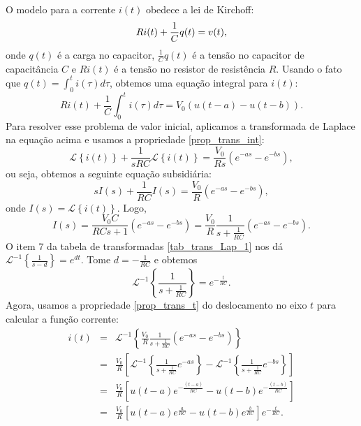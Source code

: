 O modelo para a corrente $i(t)$ obedece a lei de Kirchoff:
\begin{equation}{\label{modelo_corrente_0}}
 Ri(t)+\frac{1}{C}q(t)=v(t),
\end{equation}
onde $q(t)$ é a carga no capacitor, $\frac{1}{C}q(t)$ é a tensão no capacitor de capacitância $C$ e $Ri(t)$ é a tensão no resistor de resistência $R$. Usando o fato que $q(t)=\int_0^t i(\tau)d\tau$, obtemos uma equação integral para $i(t)$:
\begin{equation}
Ri(t)+\frac{1}{C}\int_0^t i(\tau)d\tau=V_0\left(u(t-a)-u(t-b)\right).
\end{equation}
Para resolver esse problema de valor inicial, aplicamos a transformada de Laplace na equação acima e usamos a propriedade \ref{prop_trans_int}:
\begin{equation}
\mathcal{L}\left\{i(t)\right\}+\frac{1}{sRC}\mathcal{L}\left\{i(t)\right\}=\frac{V_0}{Rs}\left(e^{-as}-e^{-bs}\right),
\end{equation}
ou seja, obtemos a seguinte equação subsidiária:
\begin{equation}
sI(s)+\frac{1}{RC}I(s)=\frac{V_0}{R}\left(e^{-as}-e^{-bs}\right),
\end{equation}
onde $I(s)=\mathcal{L}\left\{i(t)\right\}$. Logo,
\begin{equation}
I(s)=\frac{V_0 C}{RCs+1}\left(e^{-as}-e^{-bs}\right)=\frac{V_0}{R}\frac{1}{s+\frac{1}{RC}}\left(e^{-as}-e^{-bs}\right).
\end{equation}
O item 7 da tabela de transformadas \ref{tab_trans_Lap_1} nos dá $\mathcal{L}^{-1}\left\{\frac{1}{s-d}\right\}=e^{dt}$. Tome $d=-\frac{1}{RC}$ e obtemos
\begin{equation}
\mathcal{L}^{-1}\left\{\frac{1}{s+\frac{1}{RC}}\right\}=e^{-\frac{t}{RC}}.
\end{equation}
Agora, usamos a propriedade \ref{prop_trans_t} do deslocamento no eixo $t$ para calcular a função corrente:
\begin{eqnarray*}
i(t)&=&\mathcal{L}^{-1}\left\{\frac{V_0}{R}\frac{1}{s+\frac{1}{RC}}\left(e^{-as}-e^{-bs}\right)\right\}\\
&=&\frac{V_0}{R}\left[\mathcal{L}^{-1}\left\{\frac{1}{s+\frac{1}{RC}}e^{-as}\right\}-\mathcal{L}^{-1}\left\{\frac{1}{s+\frac{1}{RC}}e^{-bs}\right\}\right]\\
&=&\frac{V_0}{R}\left[u(t-a)e^{-\frac{(t-a)}{RC}}-u(t-b)e^{-\frac{(t-b)}{RC}}\right]\\
&=&\frac{V_0}{R}\left[u(t-a)e^{\frac{a}{RC}}-u(t-b)e^{\frac{b}{RC}}\right]e^{-\frac{t}{RC}}.
\end{eqnarray*}
